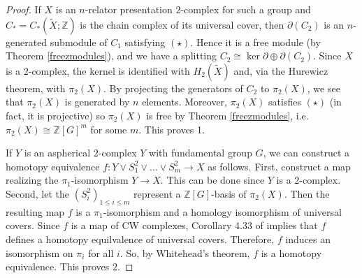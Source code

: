 \documentclass[11pt,letterpaper]{amsart}
\begin{document}
\begin{proof}
If $X$ is an $n$-relator presentation $2$-complex for such a group and $C_{\ast} = C_{\ast} (\tilde{X} ; \mathbb{Z})$ is the chain complex of its universal cover, then $\partial (C_2)$ is an $n$-generated submodule of $C_1$ satisfying $(\star)$. Hence it is a free module (by Theorem \ref{freezmodules}), and we have a splitting $C_2 \cong \ker \partial \oplus \partial (C_2)$. Since $X$ is a $2$-complex, the kernel is identified with $H_2(\tilde X)$ and, via the Hurewicz theorem, with $\pi_2(X)$. By projecting the generators of $C_2$ to $\pi_2 (X)$, we see that $\pi_2 (X)$ is generated by $n$ elements. Moreover, $\pi_2 (X)$ satisfies $(\star)$ (in fact, it is projective) so $\pi_2 (X)$ is free by Theorem \ref{freezmodules}, i.e. $\pi_2 (X) \cong\mathbb{Z} [G]^m$ for some $m$. This proves 1.
  
If $Y$ is an aspherical $2$-complex $Y$ with fundamental group $G$, we can construct a homotopy equivalence $f : Y \vee S_1^2 \vee \ldots \vee S^2_m \rightarrow X$ as follows. First, construct a map realizing the $\pi_1$-isomorphism $Y \rightarrow X$. This can be done since $Y$ is a $2$-complex. Second, let the $(S^2_i)_{1 \leqslant i \leqslant m}$ represent a $\mathbb{Z} [G]$-basis of $\pi_2  (X)$. Then the resulting map $f$ is a $\pi_1$-isomorphism and a homology isomorphism of universal covers. Since $f$ is a map of CW complexes, Corollary 4.33 of \cite{hatcherbook} implies that $f$ defines a homotopy equilvalence of universal covers. Therefore, $f$ induces an isomorphism on $\pi_i$ for all $i$. So, by Whitehead's theorem, $f$ is a homotopy equivalence.  This proves 2.
\end{proof}



\end{document}

